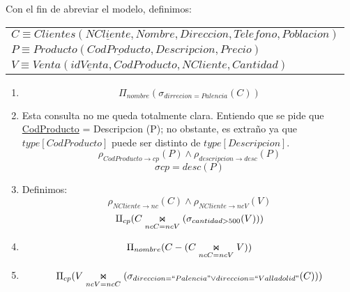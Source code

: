 Con el fin de abreviar el modelo, definimos:
\begin{center}
	\begin{tabular}{l}
		$C \equiv Clientes(\underline{NCliente}, Nombre, Direccion, Telefono, Poblacion)$\\
		$P \equiv Producto(\underline{CodProducto}, Descripcion, Precio)$\\
		$V \equiv Venta(\underline{idVenta}, CodProducto, NCliente, Cantidad)$\\
	\end{tabular}
\end{center}
\begin{enumerate}
	\item 
	$$\Pi_{nombre}(\sigma_{dirrecion = Palencia}(C))$$
	
	\item Esta consulta no me queda totalmente clara. Entiendo que se pide que \underline{CodProducto} = Descripcion (P); no obstante, es extraño ya que $type[CodProducto]$ puede ser distinto de $type[Descripcion]$.
	$$\rho_{CodProducto\rightarrow cp}(P) \land \rho_{descripcion \rightarrow desc}(P)$$
	$$\sigma{cp = desc}(P)$$
	
	\item Definimos:
	$$\rho_{NCliente \rightarrow nc} (C) \land \rho_{NCliente \rightarrow ncV} (V)$$
	$$\amalg _{cp}(C\innerjoin[ncC = ncV] (\sigma_{cantidad > 500} (V)))$$
	
	\item 
	$$\Pi_{nombre}(C - (C\innerjoin[ncC = ncV] V)) $$
	
	\item 
	$$\Pi_{cp}(V\innerjoin[ncV = ncC] (\sigma_{direccion = ``Palencia" \vee direccion = ``Valladolid"} (C)))$$
	
\end{enumerate}